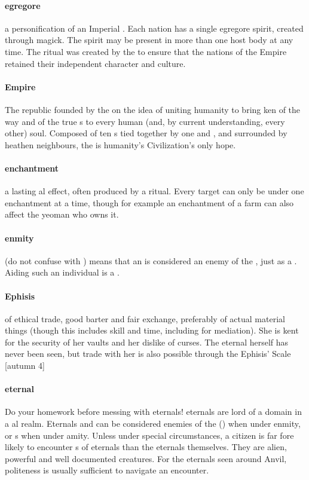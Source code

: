 \paragraph{egregore} a personification of an Imperial . Each nation has a single egregore spirit, created through  magick. The spirit may be present in more than one host body at any time. The ritual was created by the  to ensure that the nations of the Empire retained their independent character and culture.
\paragraph{Empire} The republic founded by the  on the idea of uniting humanity to bring ken of the way and of the true s to every human (and, by current understanding, every other) soul. Composed of ten s tied together by one  and , and surrounded by heathen neighbours, the  is humanity's Civilization's only hope.
\paragraph{enchantment} a lasting al effect, often produced by a ritual. Every target can only be under one enchantment at a time, though for example an enchantment of a farm can also affect the yeoman who owns it.
\paragraph{enmity} (do not confuse with ) means that an  is considered an enemy of the , just as a . Aiding such an individual is a .
\paragraph{Ephisis}   of ethical trade, good barter and fair exchange, preferably of actual material things (though this includes skill and time, including for mediation). She is kent for the security of her vaults and her dislike of curses. The eternal herself has never been seen, but trade with her is also possible through the  Ephisis' Scale [autumn  4]
\paragraph{eternal} Do your homework before messing with eternals! eternals are lord of a domain in a al realm. Eternals and can be considered enemies of the  () when under enmity, or s when under amity. Unless under special circumstances, a citizen is far fore likely to encounter s of eternals than the eternals themselves.  They are alien, powerful and well documented creatures. For the eternals seen around Anvil, politeness is usually sufficient to navigate an encounter.
